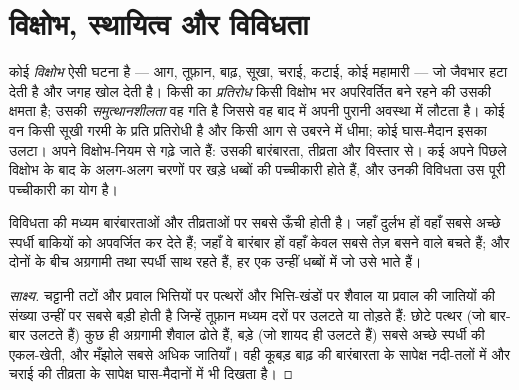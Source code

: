 \section{विक्षोभ, स्थायित्व और विविधता}

\begin{definition}[विक्षोभ, प्रतिरोध, समुत्थानशीलता]\label{def:b1:ecosystem-dynamics:disturbance}
कोई \emph{विक्षोभ} ऐसी घटना है --- आग, तूफ़ान, बाढ़, सूखा, चराई, कटाई,
कोई महामारी --- जो जैवभार हटा देती है और जगह खोल देती है। किसी 
का \emph{प्रतिरोध} किसी विक्षोभ भर अपरिवर्तित बने रहने की उसकी क्षमता है;
उसकी \emph{समुत्थानशीलता} वह गति है जिससे वह बाद में अपनी पुरानी अवस्था
में लौटता है। कोई वन किसी सूखी गरमी के प्रति प्रतिरोधी है और किसी आग से
उबरने में धीमा; कोई घास-मैदान इसका उलटा।  अपने विक्षोभ-नियम से गढ़े
जाते हैं: उसकी बारंबारता, तीव्रता और विस्तार से। कई  अपने पिछले
विक्षोभ के बाद  के अलग-अलग चरणों पर खड़े धब्बों की पच्चीकारी होते
हैं, और उनकी विविधता उस पूरी पच्चीकारी का योग है।
\end{definition}

\begin{proposition}[मध्यम विक्षोभ परिकल्पना]\label{prop:b1:ecosystem-dynamics:idh}
विविधता  की मध्यम बारंबारताओं और तीव्रताओं पर सबसे ऊँची होती है।
जहाँ  दुर्लभ हों वहाँ सबसे अच्छे स्पर्धी बाकियों को अपवर्जित कर
देते हैं; जहाँ वे बारंबार हों वहाँ केवल सबसे तेज़ बसने वाले बचते हैं; और
दोनों के बीच अग्रगामी तथा स्पर्धी साथ रहते हैं, हर एक उन्हीं धब्बों में
जो उसे भाते हैं।
\end{proposition}
\begin{proof}[साक्ष्य]
चट्टानी तटों और प्रवाल भित्तियों पर पत्थरों और भित्ति-खंडों पर शैवाल या
प्रवाल की जातियों की संख्या उन्हीं पर सबसे बड़ी होती है जिन्हें तूफ़ान
मध्यम दरों पर उलटते या तोड़ते हैं: छोटे पत्थर (जो बार-बार उलटते हैं) कुछ
ही अग्रगामी शैवाल ढोते हैं, बड़े (जो शायद ही उलटते हैं) सबसे अच्छे
स्पर्धी की एकल-खेती, और मँझोले सबसे अधिक जातियाँ। वही कूबड़ बाढ़ की
बारंबारता के सापेक्ष नदी-तलों में और चराई की तीव्रता के सापेक्ष
घास-मैदानों में भी दिखता है।
\end{proof}

